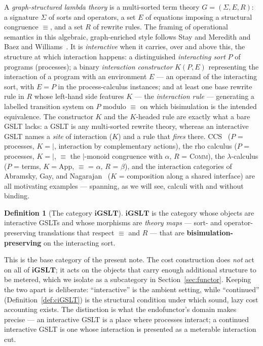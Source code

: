 \documentclass[11pt]{article}
\theoremstyle{definition}
\newtheorem{definition}{Definition}[section]
\theoremstyle{plain}
\newcommand{\iGSLT}{\mathbf{iGSLT}}
\newcommand{\Seq}{\equiv}
\newcommand{\Par}{\mathbin{|}}
\begin{document}
A \emph{graph-structured lambda theory} is a multi-sorted term theory
$G = (\Sigma, E, R)$: a signature $\Sigma$ of sorts and operators, a set
$E$ of equations imposing a structural congruence $\Seq$, and a set $R$
of rewrite rules. The framing of operational semantics in this
algebraic, graph-enriched style follows Stay and Meredith and
Baez and Williams~\cite{StayMeredith2017,BaezWilliams2019}. It is
\emph{interactive} when it carries, over and above this, the structure at
which interaction happens: a distinguished \emph{interacting sort} $P$ of
programs (processes); a binary \emph{interaction constructor} $K(P,E)$
representing the interaction of a program with an environment $E$ --- an
operand of the interacting sort, with $E = P$ in the process-calculus
instances; and at least one base rewrite rule in $R$ whose left-hand side
features $K$ --- the \emph{interaction rule} --- generating a labelled
transition system on $P$ modulo $\Seq$ on which bisimulation is the
intended equivalence. The constructor $K$ and the $K$-headed rule are
exactly what a bare GSLT lacks: a GSLT is any multi-sorted rewrite theory,
whereas an interactive GSLT names a \emph{site} of interaction ($K$) and a
rule that \emph{fires} there. CCS~\cite{MilnerCCS1980} ($P$ = processes,
$K = {\Par}$, interaction by complementary actions), the rho calculus
($P$ = processes, $K = {\Par}$, $\Seq$ the $\Par$-monoid congruence with
$\alpha$, $R$ = \textsc{Comm}), the $\lambda$-calculus ($P$ = terms,
$K = \mathrm{App}$, $\Seq$ = $\alpha$, $R$ = $\beta$), and the interaction
categories of Abramsky, Gay, and
Nagarajan~\cite{AbramskyGayNagarajan1996} ($K$ = composition along a
shared interface) are all motivating examples --- spanning, as we will
see, calculi with and without binding.

\begin{definition}[The category $\iGSLT$]
\label{def:iGSLT}
$\iGSLT$ is the category whose objects are interactive GSLTs and whose
morphisms are \emph{theory maps} --- sort- and operator-preserving
translations that respect $\Seq$ and $R$ --- that are
\textbf{bisimulation-preserving} on the interacting sort.
\end{definition}

This is the base category of the present note. The cost construction
does \emph{not} act on all of $\iGSLT$; it acts on the objects that
carry enough additional structure to be metered, which we isolate as a
subcategory in Section~\ref{sec:functor}. Keeping the two apart is
deliberate: ``interactive'' is the ambient setting, while ``continued''
(Definition~\ref{def:ciGSLT}) is the structural condition under which
sound, lazy cost accounting exists. The distinction is what the
endofunctor's domain makes precise --- an interactive GSLT is a place
where processes interact; a continued interactive GSLT is one whose
interaction is presented as a meterable interaction cut.
\end{document}
